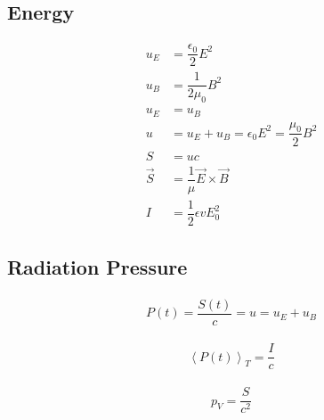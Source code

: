 \documentclass{article}
\begin{document}
\subsection{Energy}

\begin{equation}
  \begin{aligned}
    u_{E} &= \dfrac{\epsilon_{0}}{2} E^{2} \\
    u_{B} &= \dfrac{1}{2\mu_{0}} B^{2} \\
    u_{E} &= u_{B} \\
    u &= u_{E} + u_{B} = \epsilon_{0} E^{2} = \dfrac{\mu_{0}}{2} B^{2} \\ 
    S &= uc \\
    \vec{S} &= \dfrac{1}{\mu} \vec{E} \times \vec{B} \\
    I &= \dfrac{1}{2} \epsilon v E_0^2
  \end{aligned}
\end{equation}

\subsection{Radiation Pressure}

\begin{equation}
  \begin{aligned}
    P(t) = \dfrac{S(t)}{c} = u = u_E + u_B
  \end{aligned}
\end{equation}

\begin{equation}
  \begin{aligned}
    \left< P(t) \right>_T = \dfrac{I}{c} 
  \end{aligned}
\end{equation}

\begin{equation}
  \begin{aligned}
    p_V = \dfrac{S}{c^{2}} 
  \end{aligned}
\end{equation}
\end{document}
